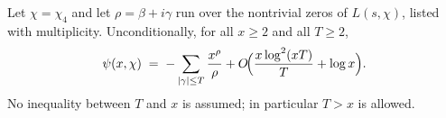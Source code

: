 %

\begin{lemma}\label{lem:classical}
Let $\chi=\chi_4$ and let $\rho=\beta+i\gamma$ run over the nontrivial
zeros of $L(s,\chi)$, listed with multiplicity. Unconditionally, for all
$x\ge2$ and all $T\ge2$,
\begin{equation}\label{eq:classical}
\psi(x,\chi)\;=\;-\sum_{|\gamma|\le T}\frac{x^{\rho}}{\rho}
+O\!\Bigl(\frac{x\log^2(xT)}{T}+\log x\Bigr).
\end{equation}
No inequality between $T$ and $x$ is assumed; in particular $T>x$ is
allowed.
\end{lemma}

